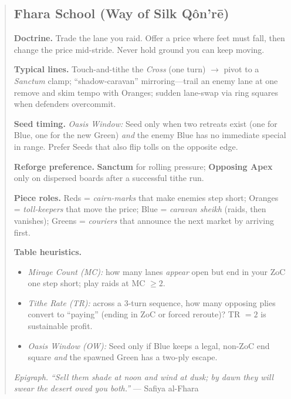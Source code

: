 \documentclass[11pt]{article}
\begin{document}
\begin{quote}
\clearpage
\subsection*{Fhara School (Way of Silk Qôn’rē)}

\noindent\textbf{Doctrine.} Trade the lane you raid. Offer a price where feet must fall, then change the price mid-stride. Never hold ground you can keep moving.

\medskip
\noindent\textbf{Typical lines.} Touch-and-tithe the \emph{Cross} (one turn) $\rightarrow$ pivot to a \emph{Sanctum} clamp; “shadow-caravan” mirroring—trail an enemy lane at one remove and skim tempo with Oranges; sudden lane-swap via ring squares when defenders overcommit.

\medskip
\noindent\textbf{Seed timing.} \emph{Oasis Window:} Seed only when two retreats exist (one for Blue, one for the new Green) \emph{and} the enemy Blue has no immediate special in range. Prefer Seeds that also flip tolls on the opposite edge.

\medskip
\noindent\textbf{Reforge preference.} \textbf{Sanctum} for rolling pressure; \textbf{Opposing Apex} only on dispersed boards after a successful tithe run.

\medskip
\noindent\textbf{Piece roles.} Reds = \emph{cairn-marks} that make enemies step short; Oranges = \emph{toll-keepers} that move the price; Blue = \emph{caravan sheikh} (raids, then vanishes); Greens = \emph{couriers} that announce the next market by arriving first.

\medskip
\noindent\textbf{Table heuristics.}
\begin{itemize}[leftmargin=1.3em,itemsep=0.2em]
  \item \emph{Mirage Count (MC):} how many lanes \emph{appear} open but end in your ZoC one step short; play raids at MC $\ge 2$.
  \item \emph{Tithe Rate (TR):} across a 3-turn sequence, how many opposing plies convert to “paying” (ending in ZoC or forced reroute)? TR $= 2$ is sustainable profit.
  \item \emph{Oasis Window (OW):} Seed only if Blue keeps a legal, non-ZoC end square \emph{and} the spawned Green has a two-ply escape.
\end{itemize}

\medskip
\noindent\textit{Epigraph.} \emph{“Sell them shade at noon and wind at dusk; by dawn they will swear the desert owed you both.”} — Safiya al-Fhara


\end{quote}
\end{document}
